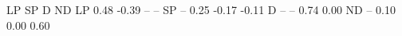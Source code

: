 \begin{Schunk}
\begin{Soutput}
     LP    SP     D    ND
LP 0.48 -0.39    --    --
SP   --  0.25 -0.17 -0.11
D    --    --  0.74  0.00
ND   --  0.10  0.00  0.60
\end{Soutput}
\end{Schunk}
